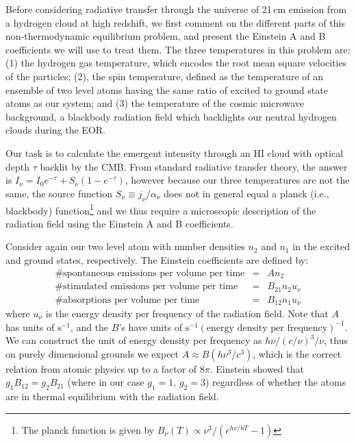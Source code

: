Before considering radiative transfer through the universe of 21\,cm emission from a hydrogen cloud at high redshift, we first comment on the different parts of this non-thermodynamic equilibrium problem, and present the Einstein A and B coefficients we will use to treat them. The three temperatures in this problem are: (1) the hydrogen gas temperature, which encodes the root mean square velocities of the particles; (2), the spin temperature, defined as the temperature of an ensemble of two level atoms having the same ratio of excited to ground state atoms as our system; and (3) the temperature of the cosmic microwave background, a blackbody radiation field which backlights our neutral hydrogen clouds during the EOR. 

Our task is to calculate the emergent intensity through an HI cloud with optical depth $\tau$ backlit by the CMB. From standard radiative transfer theory, the answer is $I_\nu=I_0e^{-\tau}+S_\nu(1-e^{-\tau})$, however because our three temperatures are not the same, the source function $S_\nu\equiv j_\nu/\alpha_\nu$ does not in general equal a planck (i.e., blackbody) function\footnote{The planck function is given by $B_\nu(T)\propto\nu^3/(e^{h\nu/kT}-1)$} and we thus require a microscopic description of the radiation field using the Einstein A and B coefficients.

Consider again our two level atom with number densities $n_2$ and $n_1$ in the excited and ground states, respectively. The Einstein coefficients are defined by:
\begin{eqnarray}
\text{\# spontaneous emissions per volume per time}&=&An_2 \nonumber\\
\text{\# stimulated emissions per volume per time}&=&B_{21}n_2u_\nu \nonumber\\
\text{\# absorptions per volume per time}&=&B_{12}n_1u_\nu 
\end{eqnarray}
where $u_\nu$ is the energy density per frequency of the radiation field. Note that $A$ has units of $\text{s}^{-1}$, and the $B$'s have units of $\text{s}^{-1}(\text{energy density per frequency})^{-1}$. We can construct the unit of energy density per frequency as $h\nu/(c/\nu)^3/\nu$, thus on purely dimensional grounds we expect $A\approx B (h\nu^3/c^3)$, which is the correct relation from atomic physics up to a factor of $8\pi$. Einstein showed that $g_1B_{12}=g_2B_{21}$ (where in our case $g_1=1$, $g_2=3$) regardless of whether the atoms are in thermal equilibrium with the radiation field.

